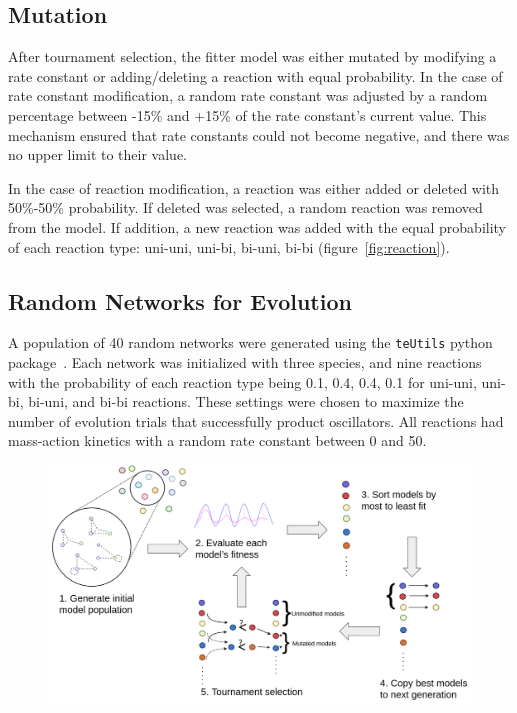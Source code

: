 \documentclass[12pt]{report}
\begin{document}
\subsection{Mutation}
After tournament selection, the fitter model was either mutated by modifying a rate constant or adding/deleting a reaction with equal probability. In the case of rate constant modification, a random rate constant was adjusted by a random percentage between -15\% and +15\% of the rate constant's current value. This mechanism ensured that rate constants could not become negative, and there was no upper limit to their value. 

In the case of reaction modification, a reaction was either added or deleted with 50\%-50\% probability. If deleted was selected, a random reaction was removed from the model. If addition, a new reaction was added with the equal probability of each reaction type: uni-uni, uni-bi, bi-uni, bi-bi (figure~\ref{fig:reaction}). 

\subsection{Random Networks for Evolution}
A population of 40 random networks were generated using the {\tt teUtils} python package~\cite{SauroteUtils_2020}. Each network was initialized with three species, and nine reactions with the probability of each reaction type being 0.1, 0.4, 0.4, 0.1 for uni-uni, uni-bi, bi-uni, and bi-bi reactions. These settings were chosen to maximize the number of evolution trials that successfully product oscillators. All reactions had mass-action kinetics with a random rate constant between 0 and 50. 
\begin{figure}
    \includegraphics[width=12cm]{images/algorithm.png}
    \label{fig:algorithm}
\end{figure}
\end{document}
